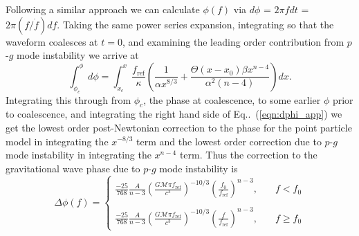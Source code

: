 Following a similar approach we can calculate $\phi(f)$ via $d\phi$ = $2 \pi f dt$ = $2 \pi (f/\dot{f}) df$. Taking the same power series expansion, integrating so that the waveform coalesces at $t = 0$, and examining the leading order contribution from $p$-$g$ mode instability we arrive at
\begin{equation}\label{eqn:dphi_app}
\int_{\phi_c}^\phi d\phi = \int_{x_c}^{x} \frac{f_{\mathrm{ref}}}{\kappa} \left (\frac{1}{\alpha x^{8/3}} +  \frac{\Theta(x - x_0) \beta x^{n-4}}{\alpha^2 (n-4)} \right ) dx.
\end{equation}
Integrating this through from $\phi_c$, the phase at coalescence, to some earlier $\phi$ prior to coalescence, and integrating the right hand side of Eq..~(\ref{eqn:dphi_app}) we get the lowest order post-Newtonian correction to the phase for the point particle model in integrating the $x^{-8/3}$ term and the lowest order correction due to $p$-$g$ mode instability in integrating the $x^{n-4}$ term. Thus the correction to the gravitational wave phase due to $p$-$g$ mode instability is 
\begin{equation}\label{eqn:delta_phi_app}
\Delta \phi(f) = \left \{
                     \begin{array}{ll}
                     \frac{-25}{768} \frac{A}{n-3} \left ( \frac{G \mathcal{M} \pi f_{\mathrm{ref}}}{c^3} \right )^{-10/3} \left ( \frac{f_0}{f_{\mathrm{ref}}} \right )^{n-3}, &\quad  f < f_0 \\ \\
                     \frac{-25}{768} \frac{A}{n-3} \left ( \frac{G \mathcal{M} \pi f_{\mathrm{ref}}}{c^3} \right )^{-10/3} \left ( \frac{f}{f_{\mathrm{ref}}} \right )^{n-3}, &\quad  f \ge f_0
                     \end{array}
                     \right.
\end{equation}

